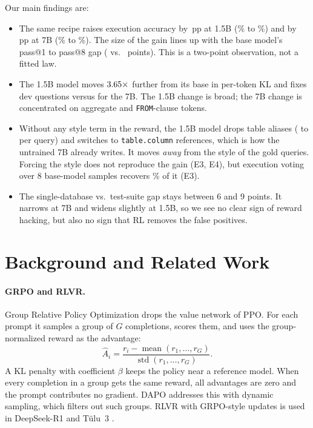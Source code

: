 \documentclass[11pt]{article}
\newcommand{\pp}{\,pp}
\begin{document}
Our main findings are:
\begin{itemize}
  \item The same recipe raises execution accuracy by \dExS\pp{} at 1.5B
        (\ExPctSB\% to \ExPctSR\%) and by \dExL\pp{} at 7B (\ExPctLB\% to \ExPctLR\%).
        The size of the gain lines up with the base model's pass@1 to pass@8 gap
        (\HeadS{} vs.\ \HeadL{} points). This is a two-point observation, not a fitted law.
  \item The 1.5B model moves $3.65\times$ further from its base in per-token KL and
        fixes \FixedS{} dev questions versus \FixedL{} for the 7B. The 1.5B change is broad;
        the 7B change is concentrated on aggregate and \texttt{FROM}-clause tokens.
  \item Without any style term in the reward, the 1.5B model drops table aliases
        (\AliasSB{} to \AliasSR{} per query) and switches to \texttt{table.column} references,
        which is how the untrained 7B already writes. It moves \emph{away} from the
        style of the gold queries. Forcing the style does not reproduce the gain
        (E3, E4), but execution voting over 8 base-model samples recovers
        \EthreeVoteShareTs\% of it (E3).
  \item The single-database vs.\ test-suite gap stays between 6 and 9 points.
        It narrows at 7B and widens slightly at 1.5B, so we see no clear sign of
        reward hacking, but also no sign that RL removes the false positives.
\end{itemize}

\section{Background and Related Work}

\paragraph{GRPO and RLVR.}
Group Relative Policy Optimization \citep{shao2024deepseekmath} drops the value
network of PPO. For each prompt it samples a group of $G$ completions, scores
them, and uses the group-normalized reward as the advantage:
\begin{equation}
  \hat{A}_i = \frac{r_i - \operatorname{mean}(r_1,\dots,r_G)}{\operatorname{std}(r_1,\dots,r_G)} .
\end{equation}
A KL penalty with coefficient $\beta$ keeps the policy near a reference model.
When every completion in a group gets the same reward, all advantages are zero
and the prompt contributes no gradient. DAPO \citep{yu2025dapo} addresses this
with dynamic sampling, which filters out such groups. RLVR with GRPO-style
updates is used in DeepSeek-R1 \citep{guo2025deepseekr1} and T\"ulu~3
\citep{lambert2024tulu3}.
\end{document}
